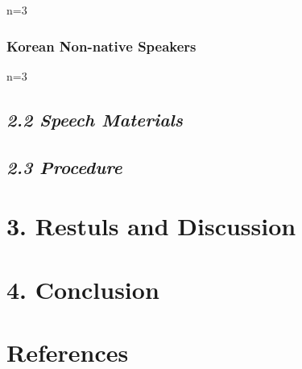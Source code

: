 \documentclass[man, fleqn, noextraspace]{apa6}
\begin{document}
n=3

\subsubsection{Korean Non-native
Speakers}\label{korean-non-native-speakers}

n=3

\subsection{\texorpdfstring{\emph{2.2 Speech
Materials}}{2.2 Speech Materials}}\label{speech-materials}

\subsection{\texorpdfstring{\emph{2.3
Procedure}}{2.3 Procedure}}\label{procedure}

\section{\texorpdfstring{\textbf{3. Restuls and
Discussion}}{3. Restuls and Discussion}}\label{restuls-and-discussion}

\section{\texorpdfstring{\textbf{4.
Conclusion}}{4. Conclusion}}\label{conclusion}

\newpage

\section{\texorpdfstring{\textbf{References}}{References}}\label{references}

\begingroup
\setlength{\parindent}{-0.5in} \setlength{\leftskip}{0.5in}

\hypertarget{refs}{}

\endgroup
\end{document}
